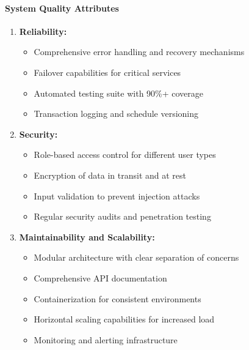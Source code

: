 \paragraph{System Quality Attributes}
\begin{enumerate}[label=\arabic*., nosep,leftmargin=*,topsep=2pt, partopsep=0pt, itemsep=1pt]
    \item \textbf{Reliability:}
        \begin{itemize}[label=\textendash, nosep,leftmargin=*,topsep=1pt, partopsep=0pt, itemsep=0pt]
            \item Comprehensive error handling and recovery mechanisms
            \item Failover capabilities for critical services
            \item Automated testing suite with 90\%+ coverage
            \item Transaction logging and schedule versioning
        \end{itemize}
    \item \textbf{Security:}
        \begin{itemize}[label=\textendash, nosep,leftmargin=*,topsep=1pt, partopsep=0pt, itemsep=0pt]
            \item Role-based access control for different user types
            \item Encryption of data in transit and at rest
            \item Input validation to prevent injection attacks
            \item Regular security audits and penetration testing
        \end{itemize}
    \item \textbf{Maintainability and Scalability:}
        \begin{itemize}[label=\textendash, nosep,leftmargin=*,topsep=1pt, partopsep=0pt, itemsep=0pt]
            \item Modular architecture with clear separation of concerns
            \item Comprehensive API documentation
            \item Containerization for consistent environments
            \item Horizontal scaling capabilities for increased load
            \item Monitoring and alerting infrastructure
        \end{itemize}
\end{enumerate}


